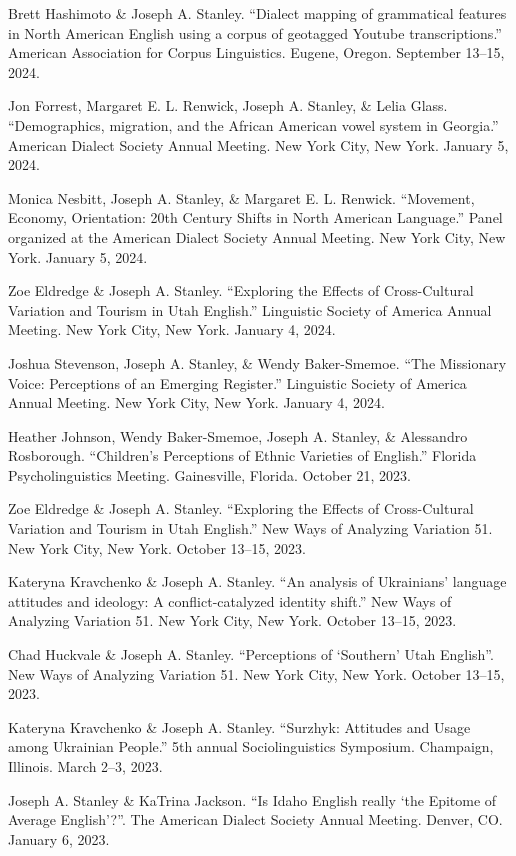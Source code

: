 \documentclass[
]{article}
\begin{document}
Brett Hashimoto \& {Joseph A. Stanley}. ``Dialect mapping of grammatical
features in North American English using a corpus of geotagged Youtube
transcriptions.'' American Association for Corpus Linguistics. Eugene,
Oregon. September 13--15, 2024.

Jon Forrest, Margaret E. L. Renwick, {Joseph A. Stanley}, \& Lelia
Glass. ``Demographics, migration, and the African American vowel system
in Georgia.'' American Dialect Society Annual Meeting. New York City,
New York. January 5, 2024.

Monica Nesbitt, {Joseph A. Stanley}, \& Margaret E. L. Renwick.
``Movement, Economy, Orientation: 20th Century Shifts in North American
Language.'' Panel organized at the American Dialect Society Annual
Meeting. New York City, New York. January 5, 2024.

{Zoe Eldredge} \& {Joseph A. Stanley}. ``Exploring the Effects of
Cross-Cultural Variation and Tourism in Utah English.'' Linguistic
Society of America Annual Meeting. New York City, New York. January 4,
2024.

{Joshua Stevenson}, {Joseph A. Stanley}, \& Wendy Baker-Smemoe. ``The
Missionary Voice: Perceptions of an Emerging Register.'' Linguistic
Society of America Annual Meeting. New York City, New York. January 4,
2024.

{Heather Johnson}, Wendy Baker-Smemoe, {Joseph A. Stanley}, \&
Alessandro Rosborough. ``Children's Perceptions of Ethnic Varieties of
English.'' Florida Psycholinguistics Meeting. Gainesville, Florida.
October 21, 2023.

{Zoe Eldredge} \& {Joseph A. Stanley}. ``Exploring the Effects of
Cross-Cultural Variation and Tourism in Utah English.'' New Ways of
Analyzing Variation 51. New York City, New York. October 13--15, 2023.

{Kateryna Kravchenko} \& {Joseph A. Stanley}. ``An analysis of
Ukrainians' language attitudes and ideology: A conflict-catalyzed
identity shift.'' New Ways of Analyzing Variation 51. New York City, New
York. October 13--15, 2023.

{Chad Huckvale} \& {Joseph A. Stanley}. ``Perceptions of `Southern' Utah
English''. New Ways of Analyzing Variation 51. New York City, New York.
October 13--15, 2023.

{Kateryna Kravchenko} \& {Joseph A. Stanley}. ``Surzhyk: Attitudes and
Usage among Ukrainian People.'' 5th annual Sociolinguistics Symposium.
Champaign, Illinois. March 2--3, 2023.

{Joseph A. Stanley} \& {KaTrina Jackson}. ``Is Idaho English really `the
Epitome of Average English'?''. The American Dialect Society Annual
Meeting. Denver, CO. January 6, 2023.
\end{document}
